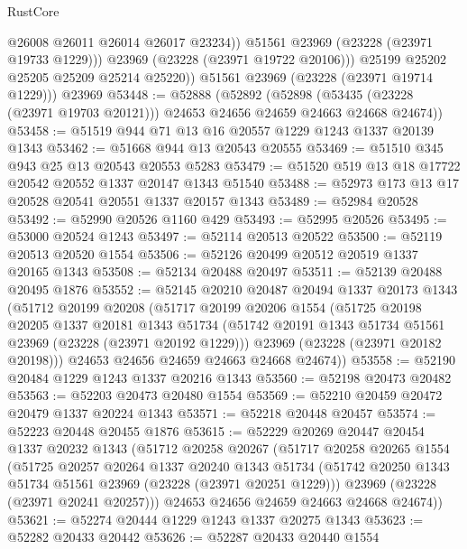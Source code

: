 \begin{lexlean}{RustCore}
\begin{coremodule}
                  @26008
                  @26011
                  @26014
                  @26017
                  @23234))
              @51561
              @23969
              (@23228 (@23971 @19733 @1229)))
            @23969
            (@23228 (@23971 @19722 @20106)))
          @25199
          @25202
          @25205
          @25209
          @25214
          @25220))
      @51561
      @23969
      (@23228 (@23971 @19714 @1229)))
    @23969
@53448 := @52888
    (@52892
      (@52898 (@53435 (@23228 (@23971 @19703 @20121))) @24653 @24656 @24659 @24663 @24668 @24674))
@53458 := @51519 @944 @71 @13 @16 @20557 @1229 @1243 @1337 @20139 @1343
@53462 := @51668 @944 @13 @20543 @20555
@53469 := @51510 @345 @943 @25 @13 @20543 @20553 @5283
@53479 := @51520 @519 @13 @18 @17722 @20542 @20552 @1337 @20147 @1343 @51540
@53488 := @52973 @173 @13 @17 @20528 @20541 @20551 @1337 @20157 @1343
@53489 := @52984 @20528
@53492 := @52990 @20526 @1160 @429
@53493 := @52995 @20526
@53495 := @53000 @20524 @1243
@53497 := @52114 @20513 @20522
@53500 := @52119 @20513 @20520 @1554
@53506 := @52126 @20499 @20512 @20519 @1337 @20165 @1343
@53508 := @52134 @20488 @20497
@53511 := @52139 @20488 @20495 @1876
@53552 := @52145
    @20210
    @20487
    @20494
    @1337
    @20173
    @1343
    (@51712
      @20199
      @20208
      (@51717
        @20199
        @20206
        @1554
        (@51725
          @20198
          @20205
          @1337
          @20181
          @1343
          @51734
          (@51742 @20191 @1343 @51734 @51561 @23969 (@23228 (@23971 @20192 @1229)))
          @23969
          (@23228 (@23971 @20182 @20198)))
        @24653
        @24656
        @24659
        @24663
        @24668
        @24674))
@53558 := @52190 @20484 @1229 @1243 @1337 @20216 @1343
@53560 := @52198 @20473 @20482
@53563 := @52203 @20473 @20480 @1554
@53569 := @52210 @20459 @20472 @20479 @1337 @20224 @1343
@53571 := @52218 @20448 @20457
@53574 := @52223 @20448 @20455 @1876
@53615 := @52229
    @20269
    @20447
    @20454
    @1337
    @20232
    @1343
    (@51712
      @20258
      @20267
      (@51717
        @20258
        @20265
        @1554
        (@51725
          @20257
          @20264
          @1337
          @20240
          @1343
          @51734
          (@51742 @20250 @1343 @51734 @51561 @23969 (@23228 (@23971 @20251 @1229)))
          @23969
          (@23228 (@23971 @20241 @20257)))
        @24653
        @24656
        @24659
        @24663
        @24668
        @24674))
@53621 := @52274 @20444 @1229 @1243 @1337 @20275 @1343
@53623 := @52282 @20433 @20442
@53626 := @52287 @20433 @20440 @1554

\end{coremodule}
\end{lexlean}
